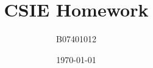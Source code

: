 \documentclass{article}
\begin{document}


\title{CSIE Homework} 
\author{B07401012}
\date{\today}
\maketitle
\end{document}
